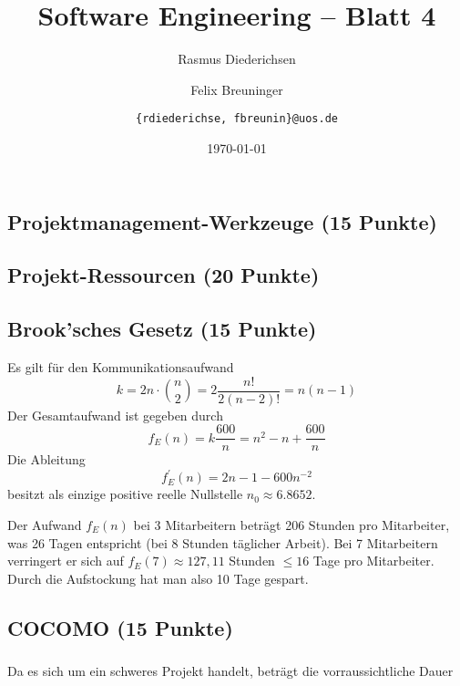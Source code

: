 \documentclass{scrartcl}
\title{\rmfamily Software Engineering -- Blatt 4}
\author{Rasmus Diederichsen \and Felix Breuninger\and %
   \texttt{\{rdiederichse, fbreunin\}@uos.de}
}
\date{\today}
\begin{document}
\selectfont
\maketitle

\setcounter{section}{4}
\setcounter{subsection}{0}

\subsection{Projektmanagement-Werkzeuge (15 Punkte)}

\subsection{Projekt-Ressourcen (20 Punkte)}

\subsection{Brook'sches Gesetz (15 Punkte)}

Es gilt für den Kommunikationsaufwand
\begin{equation*}
   k = 2n \cdot {n \choose 2} = 2 \frac{n!}{2(n-2)!} = n(n-1)
\end{equation*}
 Der Gesamtaufwand ist gegeben durch
 \begin{equation*}
    f_E(n) = k \frac{600}{n} = n^2 - n + \frac{600}{n}
 \end{equation*}
 Die Ableitung
 \begin{equation*}
    f_E^\prime(n) = 2n -1 - 600n^{-2}
 \end{equation*}
 besitzt als einzige positive reelle Nullstelle $n_0 \approx 6.8652$.

Der Aufwand $f_E(n)$ bei 3 Mitarbeitern beträgt 206 Stunden pro Mitarbeiter, was
26 Tagen entspricht (bei 8 Stunden täglicher Arbeit).
Bei 7 Mitarbeitern verringert er sich auf $f_E(7)\approx 127,11$ Stunden $\le
16$ Tage pro Mitarbeiter. Durch die Aufstockung hat man also 10 Tage gespart.

\subsection{COCOMO (15 Punkte)}

\subsubsection{}

Da es sich um ein schweres Projekt handelt, beträgt die vorraussichtliche Dauer
\end{document}
